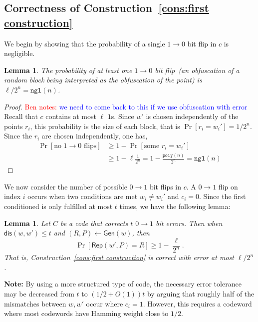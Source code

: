 \documentclass[11pt]{article}
\newcommand{\consref}[1]{\mbox{Construction~\ref{#1}}}
\newcommand{\class}[1]{{\ensuremath{\mathsf{#1}}}}
\newcommand{\gen}{\ensuremath{\class{Gen}}\xspace}
\newcommand{\rep}{\ensuremath{\class{Rep}}\xspace}
\newcommand{\dis}{\ensuremath{\mathsf{dis}}}
\newcommand{\poly}{\ensuremath{\mathtt{poly}}\xspace}
\newcommand{\ngl}{\ensuremath{\mathtt{ngl}}\xspace}
\newtheorem{lemma}[theorem]{Lemma}
\newcommand{\authnote}[2]{{\textcolor{red}{\textsf{#1 notes: }\textcolor{blue}{ #2}}\marginpar{\textcolor{red}{\textbf{!!!!!}}}}}
\newcommand{\authnote}[2]{}
\newcommand{\bnote}[1]{{\authnote{Ben}{#1}}}
\begin{document}
\subsection{Correctness of \consref{cons:first construction}}
We begin by showing that the probability of a single $1\rightarrow 0$ bit flip in $c$ is negligible.
\begin{lemma}
\label{lem:no 1 to 0 flips}
The probability of at least one $1\rightarrow 0$ bit flip~(an obfuscation of a random block being interpreted as the obfuscation of the point) is $ \ell/2^n = \ngl(n)$.
\end{lemma}
\begin{proof}
\bnote{we need to come back to this if we use obfuscation with error}
Recall that $c$ contains at most $\ell$ $1$s.  Since $w'$ is chosen independently of the points $r_i$, this probability is the size of each block, that is $\Pr[r_i =w_i']  = 1/2^n$. Since the $r_i$ are chosen independently, one has,
\begin{align*}
\Pr[\text{no $1\rightarrow 0$ flips}] &\geq 1-\Pr[\text{some }r_i = w_i']\\
&\geq 1-\ell \frac{1}{2^n} = 1-\frac{\poly(n)}{2^n} = \ngl(n)
\end{align*}
\end{proof}

We now consider the number of possible $0\rightarrow 1$ bit flips in $c$.  A $0\rightarrow 1$ flip on index $i$ occurs when two conditions are met $w_i\neq w_i'$ and $c_i = 0$.  Since the first conditioned is only fulfilled at most $t$ times, we have the following lemma:

\begin{lemma}
\label{lem:correct of cons}
Let $C$ be a code that corrects $t$ $0\rightarrow 1$ bit errors.  Then when $\dis(w, w')\leq t$ and $(R, P)\leftarrow \gen(w)$, then 
\[
\Pr[\rep( w', P) = R] \geq 1-\frac{\ell}{2^n}.
\]
That is, \consref{cons:first construction} is correct with error at most $\ell/2^n$.
\end{lemma}

\textbf{Note: }By using a more structured type of code, the necessary error tolerance may be decreased from $t$ to  $(1/2+O(1))t$ by arguing that roughly half of the mismatches between $w, w'$ occur where $c_i =1$.  However, this requires a codeword where most codewords have Hamming weight close to $1/2$.
\end{document}
